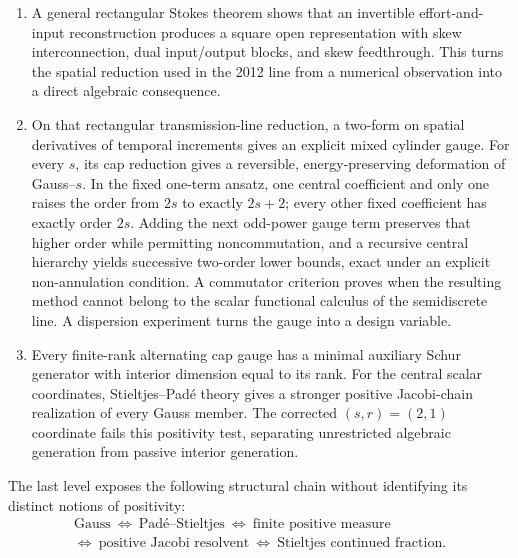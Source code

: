 \documentclass[11pt,a4paper]{article}
\begin{document}
\begin{enumerate}
  \item A general rectangular Stokes theorem shows that an invertible
  effort-and-input reconstruction produces a square open representation
  with skew interconnection, dual input/output blocks, and skew
  feedthrough.  This turns the spatial reduction used in the 2012 line
  from a numerical observation into a direct algebraic consequence.
  \item On that rectangular transmission-line reduction, a two-form on
  spatial derivatives of temporal increments gives an explicit mixed
  cylinder gauge.  For every \(s\), its cap reduction gives a
  reversible, energy-preserving deformation of Gauss--\(s\).  In the
  fixed one-term ansatz, one central coefficient and only one raises the
  order from \(2s\) to exactly \(2s+2\); every other fixed coefficient has
  exactly order \(2s\).  Adding the next odd-power gauge term preserves
  that higher order while permitting noncommutation, and a recursive
  central hierarchy yields successive two-order lower bounds, exact under
  an explicit non-annulation condition.  A commutator
  criterion proves when the resulting method cannot belong to the scalar
  functional calculus of the semidiscrete line.  A dispersion experiment
  turns the gauge into a design variable.
  \item Every finite-rank alternating cap gauge has a minimal auxiliary
  Schur generator with interior dimension equal to its rank.  For the
  central scalar coordinates, Stieltjes--Pad\'e theory gives a stronger
  positive Jacobi-chain realization of every Gauss member.  The corrected
  \((s,r)=(2,1)\) coordinate fails this positivity test, separating
  unrestricted algebraic generation from passive interior generation.
\end{enumerate}

The last level exposes the following structural chain without identifying
its distinct notions of positivity:
\begin{equation}\label{eq:gauss-stieltjes-jacobi-chain}
 \boxed{\begin{gathered}
 \text{Gauss}
 \ \Longleftrightarrow\ 
 \text{Pad\'e--Stieltjes}
 \ \Longleftrightarrow\ 
 \text{finite positive measure}\\
 \Longleftrightarrow\ 
 \text{positive Jacobi resolvent}
 \ \Longleftrightarrow\ 
 \text{Stieltjes continued fraction}.
 \end{gathered}}
\end{equation}
\end{document}
